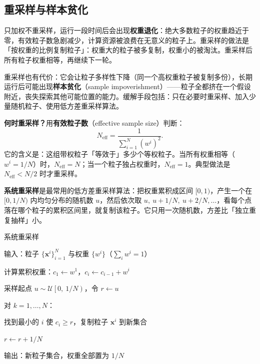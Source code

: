 \subsection{重采样与样本贫化}

只加权不重采样，运行一段时间后会出现\textbf{权重退化}：绝大多数粒子的权重趋近于零，有效粒子数急剧减少，计算资源被浪费在无意义的粒子上。重采样的做法是「按权重的比例复制粒子」：权重大的粒子被多复制，权重小的被淘汰。重采样后所有粒子权重相等，再继续下一轮。

重采样也有代价：它会让粒子多样性下降（同一个高权重粒子被复制多份），长期运行后可能出现\textbf{样本贫化}（sample impoverishment）——粒子全都挤在一个假设附近，丧失探索其他可能位置的能力。缓解手段包括：只在必要时重采样、加入少量随机粒子、使用低方差重采样算法。

\textbf{何时重采样？}用\textbf{有效粒子数}（effective sample size）判断：
\begin{equation}
  N_{\text{eff}} = \frac{1}{\sum_{i=1}^{N}\left(w^{i}\right)^{2}}.
  \label{eq:10-neff}
\end{equation}
它的含义是：这组带权粒子「等效于」多少个等权粒子。当所有权重相等（$w^i=1/N$）时，$N_{\text{eff}}=N$；当一个粒子独占权重时，$N_{\text{eff}}=1$。典型做法是 $N_{\text{eff}}<N/2$ 时才重采样。

\textbf{系统重采样}是最常用的低方差重采样算法：把权重累积成区间 $[0,1)$，产生一个在 $[0,1/N)$ 内均匀分布的随机数 $u$，然后依次取 $u,\ u+1/N,\ u+2/N,\dots$，看每个点落在哪个粒子的累积区间里，就复制该粒子。它只用一次随机数，方差比「独立重复抽样」小。

\begin{pseudo}{系统重采样}
  \item 输入：粒子 $\{\bm{x}^{i}\}_{i=1}^{N}$ 与权重 $\{w^{i}\}$（$\sum_i w^i=1$）
  \item 计算累积权重：$c_1\leftarrow w^{1}$，$c_i\leftarrow c_{i-1}+w^{i}$
  \item 采样起点 $u\sim\mathcal{U}\left[0,\ 1/N\right)$，令 $r\leftarrow u$
  \item 对 $k=1,\dots,N$：
  \item \quad 找到最小的 $i$ 使 $c_i\ge r$，复制粒子 $\bm{x}^{i}$ 到新集合
  \item \quad $r\leftarrow r+1/N$
  \item 输出：新粒子集合，权重全部置为 $1/N$
\end{pseudo}


